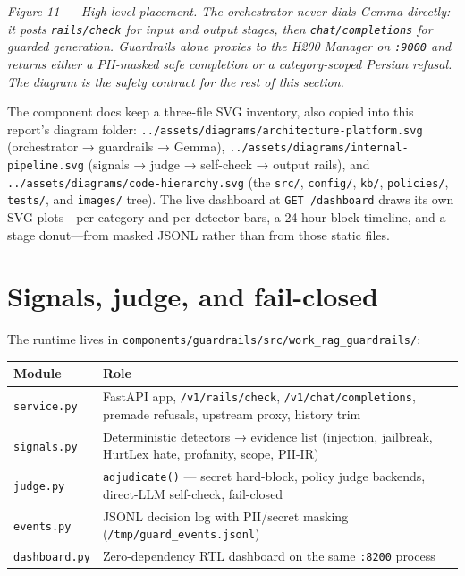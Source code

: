 \emph{Figure 11 --- High-level placement. The orchestrator never dials Gemma directly: it posts \texttt{rails/check} for input and output stages, then \texttt{chat/completions} for guarded generation. Guardrails alone proxies to the H200 Manager on \texttt{:9000} and returns either a PII-masked safe completion or a category-scoped Persian refusal. The diagram is the safety contract for the rest of this section.}

The component docs keep a three-file SVG inventory, also copied into this report's diagram folder: \texttt{../assets/diagrams/architecture-platform.svg} (orchestrator → guardrails → Gemma), \texttt{../assets/diagrams/internal-pipeline.svg} (signals → judge → self-check → output rails), and \texttt{../assets/diagrams/code-hierarchy.svg} (the \texttt{src/}, \texttt{config/}, \texttt{kb/}, \texttt{policies/}, \texttt{tests/}, and \texttt{images/} tree). The live dashboard at \texttt{GET\ /dashboard} draws its own SVG plots---per-category and per-detector bars, a 24-hour block timeline, and a stage donut---from masked JSONL rather than from those static files.

\section{Signals, judge, and fail-closed}\label{signals-judge-and-fail-closed}

The runtime lives in \texttt{components/guardrails/src/work\_rag\_guardrails/}:

\begin{longtable}[]{@{}
  >{\raggedright\arraybackslash}p{}
  >{\raggedright\arraybackslash}p{}@{}}
\toprule\noalign{}
Module & Role \\
\midrule\noalign{}
\endhead
\bottomrule\noalign{}
\endlastfoot
\texttt{service.py} & FastAPI app, \texttt{/v1/rails/check}, \texttt{/v1/chat/completions}, premade refusals, upstream proxy, history trim \\
\texttt{signals.py} & Deterministic detectors → evidence list (injection, jailbreak, HurtLex hate, profanity, scope, PII-IR) \\
\texttt{judge.py} & \texttt{adjudicate()} --- secret hard-block, policy judge backends, direct-LLM self-check, fail-closed \\
\texttt{events.py} & JSONL decision log with PII/secret masking (\texttt{/tmp/guard\_events.jsonl}) \\
\texttt{dashboard.py} & Zero-dependency RTL dashboard on the same \texttt{:8200} process \\
\end{longtable}

